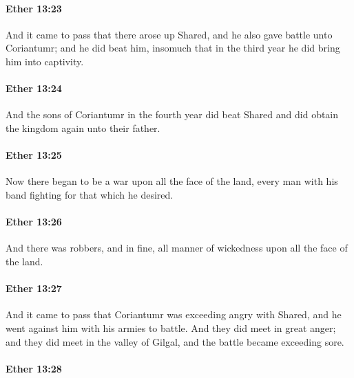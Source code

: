 		\paragraph{Ether 13:23} %
			\label{ETHER-13-23}

			And it came to pass that there arose up Shared,
			and he also gave battle unto Coriantumr;
			and he did beat him,
			insomuch that in the third year he did bring him into captivity.

		\paragraph{Ether 13:24} %
			\label{ETHER-13-24}

			And the sons of Coriantumr in the fourth year did beat Shared
			and did obtain the kingdom again unto their father.

		\paragraph{Ether 13:25} %
			\label{ETHER-13-25}

			Now there began to be a war upon all the face of the land,
			every man with his band fighting for that which he desired.

		\paragraph{Ether 13:26} %
			\label{ETHER-13-26}

			And there was robbers,
			and in fine, all manner of wickedness upon all the face of the land.

		\paragraph{Ether 13:27} %
			\label{ETHER-13-27}

			And it came to pass that Coriantumr was exceeding angry with Shared,
			and he went against him with his armies to battle.
			And they did meet in great anger;
			and they did meet in the valley of Gilgal,
			and the battle became exceeding sore.

		\paragraph{Ether 13:28} %
			\label{ETHER-13-28}

